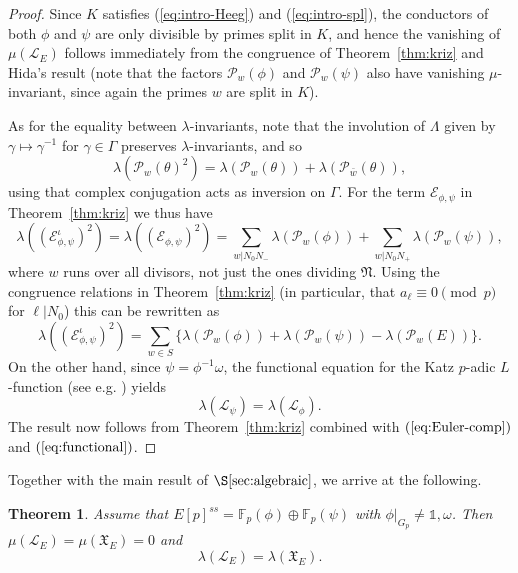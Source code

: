 \documentclass[10pt]{amsart}
\numberwithin{equation}{section}
\newtheorem{theorem}{Theorem}
\theoremstyle{definition}
\theoremstyle{remark}
\newcommand{\Lcal}{\mathcal{L}}
\begin{document}
\begin{proof}
Since $K$ satisfies (\ref{eq:intro-Heeg}) and (\ref{eq:intro-spl}), the conductors of both $\phi$ and $\psi$ are only divisible by primes split in $K$, and hence the vanishing of $\mu(\mathcal{L}_E)$ follows immediately from the congruence of Theorem~\ref{thm:kriz} and Hida's result \cite{hidamu=0} (note that the factors $\mathcal{P}_w(\phi)$ and $\mathcal{P}_w(\psi)$ also have vanishing $\mu$-invariant, since again the primes $w$ are split in $K$). 

As for the equality between $\lambda$-invariants, note that the involution of $\Lambda$ given by $\gamma\mapsto\gamma^{-1}$ for $\gamma\in\Gamma$
preserves $\lambda$-invariants, and so
\[
\lambda(\mathcal{P}_w(\theta)^2)=\lambda(\mathcal{P}_w(\theta))+\lambda(\mathcal{P}_{\bar{w}}(\theta)),
\]
using that complex conjugation acts as inversion on $\Gamma$. For the term $\mathcal{E}_{\phi,\psi}$ in Theorem~\ref{thm:kriz} we thus have
\[
\lambda((\mathcal{E}_{\phi,\psi}^\iota)^2)=
\lambda((\mathcal{E}_{\phi,\psi})^2)=\sum_{w\vert N_0N_-}\lambda(\mathcal{P}_w(\phi))+\sum_{w\vert N_0N_+}\lambda(\mathcal{P}_w(\psi)),
\]
where $w$ runs over all divisors, not just the ones dividing $\mathfrak{N}$. Using the congruence relations in Theorem~\ref{thm:kriz} (in particular, that $a_\ell\equiv 0\pmod{p}$ for $\ell\vert N_0$) this can be rewritten as
\begin{equation}\label{eq:Euler-comp}
\lambda((\mathcal{E}_{\phi,\psi}^\iota)^2)=\sum_{w\in S}\bigl\{\lambda(\mathcal{P}_w(\phi))+\lambda(\mathcal{P}_w(\psi))-\lambda(\mathcal{P}_w(E))\bigr\}.
\end{equation}
On the other hand, since $\psi=\phi^{-1}\omega$, the functional equation for the Katz $p$-adic $L$-function (see e.g. \cite[Thm.~27]{kriz}) yields
\begin{equation}\label{eq:functional}
\lambda(\mathcal{L}_\psi)=\lambda(\mathcal{L}_\phi).
\end{equation}
The result now follows from Theorem~\ref{thm:kriz} combined with $(\ref{eq:Euler-comp})$ and $(\ref{eq:functional})$.
\end{proof}

Together with the main result of $\S\ref{sec:algebraic}$, we arrive at the following.

\begin{theorem}\label{mulambda} 
Assume that $E[p]^{ss}=\mathbb{F}_p(\phi)\oplus\mathbb{F}_p(\psi)$ with $\phi\vert_{G_p}\neq\mathds{1},\omega$. Then $\mu(\mathcal{L}_E)=\mu(\mathfrak{X}_E)=0$ and 
\[
\lambda(\Lcal_E)=\lambda(\mathfrak{X}_E).
\]
\end{theorem}
\end{document}
